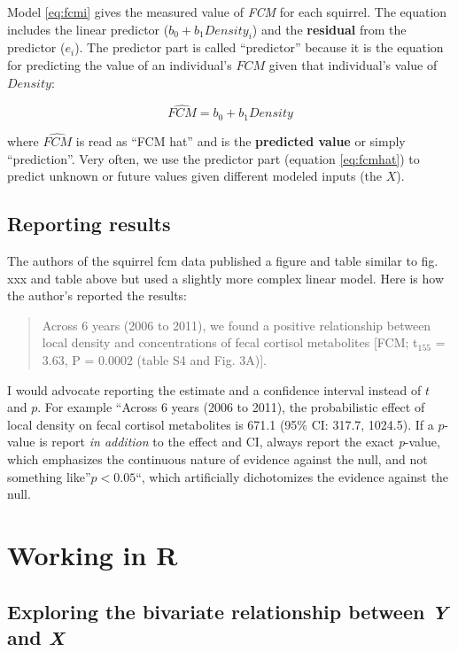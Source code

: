 \documentclass[]{book}
\begin{document}
Model \eqref{eq:fcmi} gives the measured value of \emph{FCM} for each
squirrel. The equation includes the linear predictor
(\(b_0 + b_1 Density_i\)) and the \textbf{residual} from the predictor
(\(e_i\)). The predictor part is called ``predictor'' because it is the
equation for predicting the value of an individual's \(FCM\) given that
individual's value of \(Density\):

\begin{equation}
\widehat{FCM} = b_0 + b_1 Density
\label{eq:fcmhat}
\end{equation}

where \(\widehat{FCM}\) is read as ``FCM hat'' and is the
\textbf{predicted value} or simply ``prediction''. Very often, we use
the predictor part (equation \eqref{eq:fcmhat}) to predict unknown or
future values given different modeled inputs (the \(X\)).

\subsection{Reporting results}\label{reporting-results}

The authors of the squirrel fcm data published a figure and table
similar to fig. xxx and table above but used a slightly more complex
linear model. Here is how the author's reported the results:

\begin{quote}
Across 6 years (2006 to 2011), we found a positive relationship between
local density and concentrations of fecal cortisol metabolites {[}FCM;
t\(_155\) = 3.63, P = 0.0002 (table S4 and Fig. 3A){]}.
\end{quote}

I would advocate reporting the estimate and a confidence interval
instead of \(t\) and \(p\). For example ``Across 6 years (2006 to 2011),
the probabilistic effect of local density on fecal cortisol metabolites
is 671.1 (95\% CI: 317.7, 1024.5). If a \(p\)-value is report \emph{in
addition} to the effect and CI, always report the exact \emph{p}-value,
which emphasizes the continuous nature of evidence against the null, and
not something like''\(p < 0.05\)``, which artificially dichotomizes the
evidence against the null.

\section{Working in R}\label{working-in-r}

\subsection{\texorpdfstring{Exploring the bivariate relationship between
\emph{Y} and
\emph{X}}{Exploring the bivariate relationship between Y and X}}\label{exploring-the-bivariate-relationship-between-y-and-x}
\end{document}
